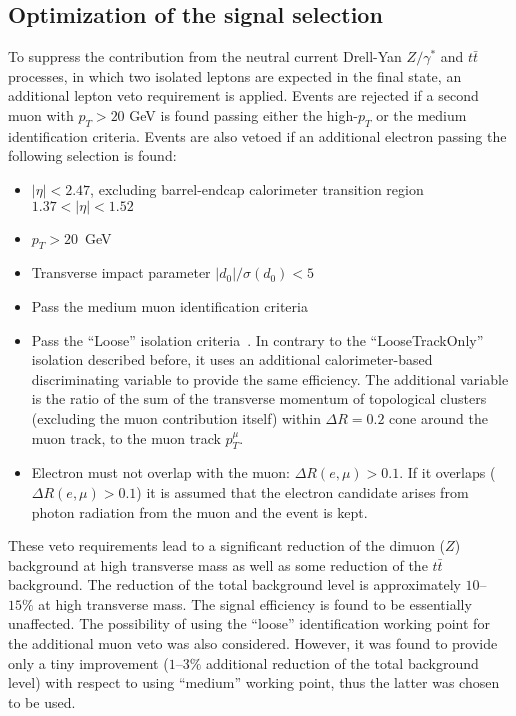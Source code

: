 \subsection{Optimization of the signal selection}
\label{subsec:wprime_cut_optimization}

To suppress the contribution from the neutral current Drell-Yan $Z/\gamma^*$ and $t\bar{t}$ processes,
in which two isolated leptons are expected in the final state, an additional lepton veto requirement
is applied. 
Events are rejected if a second muon with $p_T > 20$ GeV is found passing
either the high-$p_T$ or the medium identification criteria.
Events are also vetoed if an additional electron passing the following selection is found:
\begin{itemize}
\item $|\eta| < 2.47$, excluding barrel-endcap calorimeter transition region $1.37 < |\eta| < 1.52$
\item $p_T > 20$~GeV
\item Transverse impact parameter $|d_0|/\sigma(d_0) < 5$
\item Pass the medium muon identification criteria
\item Pass the ``Loose'' isolation criteria~\cite{muon_performance_2015,ATLAS-CONF-2016-024}.
In contrary to the ``LooseTrackOnly'' isolation described before, it uses an additional calorimeter-based discriminating variable to provide the same efficiency. The additional variable is the ratio of the sum of the transverse momentum of topological clusters~\cite{Aad:2011he} (excluding the muon contribution itself) within $\Delta R = 0.2$ cone around the muon track, to the muon track $p_T^{\mu}$.
\item Electron must not overlap with the muon: $\Delta R(e,\mu)>0.1$. If it overlaps ($\Delta R(e,\mu)>0.1$)
it is assumed that the electron candidate arises from photon radiation from the muon and the event is kept.
\end{itemize}
These veto requirements lead to a significant reduction of the dimuon ($Z$) background
at high transverse mass as well as some reduction of the $t\bar{t}$ background.
The reduction of the total background level is approximately $10$--$15\%$ at high transverse mass. 
The signal efficiency is found to be essentially unaffected.
The possibility of using the ``loose'' identification working point for the additional muon veto was also considered. However, it was found to provide only a tiny improvement ($1$--$3\%$ additional reduction of the total background level) with respect to using ``medium'' working point, thus the latter was chosen to be used.

